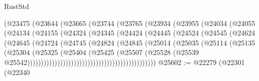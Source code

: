 \begin{lexlean}{RustStd}
\begin{coremodule}
                              (@23475
                                (@23644
                                  (@23665
                                    (@23744
                                      (@23765
                                        (@23934
                                          (@23955
                                            (@24034
                                              (@24055
                                                (@24134
                                                  (@24155
                                                    (@24324
                                                      (@24345
                                                        (@24424
                                                          (@24445
                                                            (@24524
                                                              (@24545
                                                                (@24624
                                                                  (@24645
                                                                    (@24724
                                                                      (@24745
                                                                        (@24824
                                                                          (@24845
                                                                            (@25014
                                                                              (@25035
                                                                                (@25114
                                                                                  (@25135
                                                                                    (@25304
                                                                                      (@25325
                                                                                        (@25404
                                                                                          (@25425
                                                                                            (@25507
                                                                                              (@25528
                                                                                                (@25539
                                                                                                  @25542)))))))))))))))))))))))))))))))))))))))))))))))
@25602 := @22279
    (@22301
      (@22340

\end{coremodule}
\end{lexlean}
